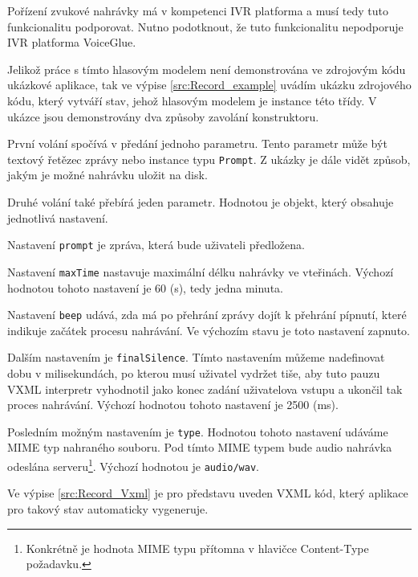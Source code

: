 \documentclass[ing,male,java,dept460,twoside]{diploma}						%
\begin{document}
Pořízení zvukové nahrávky má v kompetenci IVR platforma a musí tedy tuto funkcionalitu podporovat. Nutno podotknout, že tuto funkcionalitu nepodporuje IVR platforma VoiceGlue.

Jelikož práce s tímto hlasovým modelem není demonstrována ve zdrojovým kódu ukázkové aplikace, tak ve výpise \ref{src:Record_example} uvádím ukázku zdrojového kódu, který vytváří stav, jehož hlasovým modelem je instance této třídy. V ukázce jsou demonstrovány dva způsoby zavolání konstruktoru.

První volání spočívá v předání jednoho parametru. Tento parametr může být textový řetězec zprávy nebo instance typu \texttt{Prompt}. Z ukázky je dále vidět způsob, jakým je možné nahrávku uložit na disk.

Druhé volání také přebírá jeden parametr. Hodnotou je objekt, který obsahuje jednotlivá nastavení.

Nastavení \texttt{prompt} je zpráva, která bude uživateli předložena.

Nastavení \texttt{maxTime} nastavuje maximální délku nahrávky ve vteřinách. Výchozí hodnotou tohoto nastavení je 60 (s), tedy jedna minuta.

Nastavení \texttt{beep} udává, zda má po přehrání zprávy dojít k přehrání pípnutí, které indikuje začátek procesu nahrávání. Ve výchozím stavu je toto nastavení zapnuto.

Dalším nastavením je \texttt{finalSilence}. Tímto nastavením můžeme nadefinovat dobu v milisekundách, po kterou musí uživatel vydržet tiše, aby tuto pauzu VXML interpretr vyhodnotil jako konec zadání uživatelova vstupu a ukončil tak proces nahrávání. Výchozí hodnotou tohoto nastavení je 2500 (ms).

Posledním možným nastavením je \texttt{type}. Hodnotou tohoto nastavení udáváme MIME typ nahraného souboru. Pod tímto MIME typem bude audio nahrávka odeslána serveru\footnote{Konkrétně je hodnota MIME typu přítomna v hlavičce Content-Type požadavku.}. Výchozí hodnotou je \texttt{audio/wav}.



Ve výpise \ref{src:Record_Vxml} je pro představu uveden VXML kód, který aplikace pro takový stav automaticky vygeneruje.


\end{document}
